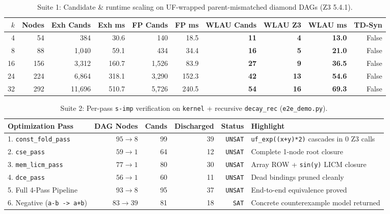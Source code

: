 \documentclass[11pt,a4paper]{article}
\begin{document}
\begin{table}[!htbp]
\centering
\caption{Suite 1: Candidate \& runtime scaling on UF-wrapped parent-mismatched diamond DAGs (Z3 5.4.1).}
\label{tab:scaling}
\footnotesize
\begin{tabularx}{\linewidth}{@{}rrrrrrrrrr@{}}
\toprule
\textbf{$k$} & \textbf{Nodes} & \textbf{Exh Cands} & \textbf{Exh ms} & \textbf{FP Cands} & \textbf{FP ms} & \textbf{WLAU Cands} & \textbf{WLAU Z3} & \textbf{WLAU ms} & \textbf{TD-Syn} \\
\midrule
4  & 54  & 384    & 30.6  & 140   & 18.5  & \textbf{11} & \textbf{4}  & \textbf{13.0} & False \\
8  & 88  & 1,040  & 59.1  & 434   & 34.4  & \textbf{16} & \textbf{5}  & \textbf{21.0} & False \\
16 & 156 & 3,312  & 160.7 & 1,526 & 83.9  & \textbf{27} & \textbf{9}  & \textbf{36.5} & False \\
24 & 224 & 6,864  & 318.1 & 3,290 & 152.3 & \textbf{42} & \textbf{13} & \textbf{54.6} & False \\
32 & 292 & 11,696 & 510.7 & 5,726 & 240.5 & \textbf{54} & \textbf{16} & \textbf{69.3} & False \\
\bottomrule
\end{tabularx}
\end{table}

\begin{table}[!htbp]
\centering
\caption{Suite 2: Per-pass \texttt{s-imp} verification on \texttt{kernel} + recursive \texttt{decay\_rec} (\texttt{e2e\_demo.py}).}
\label{tab:e2e}
\footnotesize
\begin{tabularx}{\linewidth}{@{}lrrrrl@{}}
\toprule
\textbf{Optimization Pass} & \textbf{DAG Nodes} & \textbf{Cands} & \textbf{Discharged} & \textbf{Status} & \textbf{Highlight} \\
\midrule
1. \texttt{const\_fold\_pass} & $95 \to 8$ & 99 & 39 & \texttt{UNSAT} & \texttt{uf\_exp((x+y)*2)} cascades in 0 Z3 calls \\
2. \texttt{cse\_pass} & $59 \to 1$ & 64 & 12 & \texttt{UNSAT} & Complete 1-node root closure \\
3. \texttt{mem\_licm\_pass} & $77 \to 1$ & 80 & 30 & \texttt{UNSAT} & Array ROW + \texttt{sin(y)} LICM closure \\
4. \texttt{dce\_pass} & $56 \to 1$ & 60 & 11 & \texttt{UNSAT} & Dead bindings pruned cleanly \\
5. Full 4-Pass Pipeline & $93 \to 8$ & 95 & 37 & \texttt{UNSAT} & End-to-end equivalence proved \\
6. Negative (\texttt{a-b -> a+b}) & $83 \to 39$ & 81 & 18 & \texttt{SAT} & Concrete counterexample model returned \\
\bottomrule
\end{tabularx}
\end{table}
\end{document}
